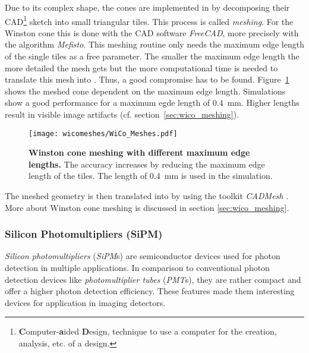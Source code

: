 Due to its complex shape, the cones are implemented in \geant by decomposing their CAD\footnote{\textbf{C}omputer-\textbf{a}ided \textbf{D}esign, technique to use a computer for the creation, analysis, etc. of a design.} sketch into small triangular tiles. This process is called \textit{meshing}. For the \iceact Winston cone this is done with the CAD software \textit{FreeCAD}, more precisely with the algorithm \textit{Mefisto}. This meshing routine only needs the maximum edge length of the single tiles as a free parameter. The smaller the maximum edge length the more detailed the mesh gets but the more computational time is needed to translate this mesh into \geant. Thus, a good compromise has to be found. Figure~\ref{wico:meshing} shows the meshed cone dependent on the maximum edge length. Simulations show a good performance for a maximum egde length of \SI{0.4}{\milli\meter}. Higher lengths result in visible image artifacts (cf. section~\ref{sec:wico_meshing}).\\

\begin{figure}[H]
	\centering
	\texttt{[image: wicomeshes/WiCo\_Meshes.pdf]}
	\caption[\iceact Winston cone meshing with different maximum edge lengths]{\textbf{\iceact Winston cone meshing with different maximum edge lengths.} The accuracy increases by reducing the maximum edge length of the tiles. The length of \SI{0.4}{\milli\meter} is used in the simulation.}
	\label{wico:meshing}	
\end{figure}

The meshed geometry is then translated into \geant by using the toolkit \textit{CADMesh} \cite{wico:cadmesh}. More about Winston cone meshing is discussed in section \ref{sec:wico_meshing}.

\subsubsection{Silicon Photomultipliers (SiPM)}\label{sec:sipm:working_principle}

\textit{Silicon photomultipliers} (\textit{SiPM}s) are semiconductor devices used for photon detection in multiple applications. In comparison to conventional photon detection devices like \textit{photomultiplier tubes} (\textit{PMT}s), they are rather compact and offer a higher photon detection efficiency. These features made them interesting devices for application in imaging detectors.\\

